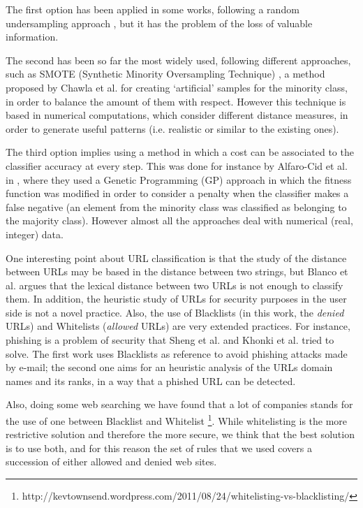 \documentclass{llncs}
\begin{document}
The first option has been applied in some works, following a random undersampling approach \cite{random_undersampling_08}, but it has the problem of the loss of valuable information. 

The second has been so far the most widely used, following different approaches, such as SMOTE (Synthetic Minority Oversampling Technique) \cite{smote_02}, a method proposed by Chawla et al. for creating `artificial' samples for the minority class, in order to balance the amount of them with respect. However this technique is based in numerical computations, which consider different distance measures, in order to generate useful patterns  (i.e. realistic or similar to the existing ones).

The third option implies using a method in which a cost can be associated to the classifier accuracy at every step. This was done for instance by Alfaro-Cid et al. in \cite{cost_adjustment_07}, where they used a Genetic Programming (GP) approach in which the fitness function was modified in order to consider a penalty when the classifier makes a false negative (an element from the minority class was classified as belonging to the majority class).
However almost all the approaches deal with numerical (real, integer) data.

One interesting point about URL classification is that the study of the distance between URLs may be based in the distance between two strings, but Blanco et al. \cite{Blanco2011} argues that the lexical distance between two URLs is not enough to classify them. In addition, the heuristic study of URLs for security purposes in the user side is not a novel practice. Also, the use of Blacklists (in this work, the \textit{denied} URLs) and Whitelists (\textit{allowed} URLs) are very extended practices. For instance, phishing is a problem of security that Sheng et al.  and Khonki et al. \cite{Khonji2011} tried to solve. The first work uses Blacklists as reference to avoid phishing attacks made by e-mail; the second one aims for an heuristic analysis of the URLs domain names and its ranks, in a way that a phished URL can be detected.

Also, doing some web searching we have found that a lot of companies stands for the use of one between Blacklist and Whitelist \footnote{http://kevtownsend.wordpress.com/2011/08/24/whitelisting-vs-blacklisting/}. While whitelisting is the more restrictive solution and therefore the more secure, we think that the best solution is to use both, and for this reason the set of rules that we used covers a succession of either allowed and denied web sites.
\end{document}
